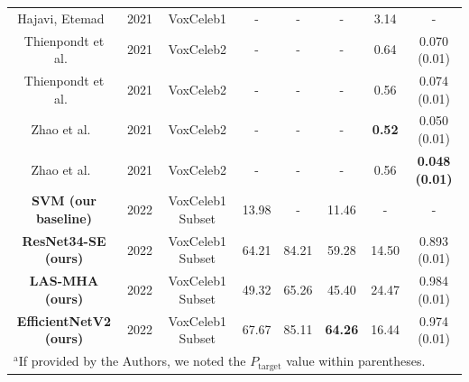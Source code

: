 \documentclass[conference]{IEEEtran}
\begin{document}
\begin{table}[htbp]
\begin{center}
\begin{tabular}{|c|c|c|c|c|c|c|c|}
        Hajavi, Etemad~\cite{hajavi2021siamese} & 2021 & VoxCeleb1 & - & - & - & 3.14 & - \\
        Thienpondt et al.~\cite{thienpondt2021voxsrc} & 2021 & VoxCeleb2 & - & - & - & 0.64 & 0.070 (0.01) \\
        Thienpondt et al.~\cite{thienpondt2021voxsrc} & 2021 & VoxCeleb2 & - & - & - & 0.56 & 0.074 (0.01) \\
        Zhao et al.~\cite{zhao2021speakin} & 2021 & VoxCeleb2 & - & - & - & \textbf{0.52} & 0.050 (0.01) \\
        Zhao et al.~\cite{zhao2021speakin} & 2021 & VoxCeleb2 & - & - & - & 0.56 & \textbf{0.048 (0.01)} \\
        \hline
        \textbf{SVM (our baseline)} & 2022 & VoxCeleb1 Subset & 13.98 & - & 11.46 & - & - \\
        \textbf{ResNet34-SE (ours)} & 2022 & VoxCeleb1 Subset & 64.21 & 84.21 & 59.28 & 14.50 & 0.893 (0.01) \\
        \textbf{LAS-MHA (ours)} & 2022 & VoxCeleb1 Subset & 49.32 & 65.26 & 45.40 & 24.47 & 0.984 (0.01) \\
        \textbf{EfficientNetV2 (ours)} & 2022 & VoxCeleb1 Subset & 67.67 & 85.11 & \textbf{64.26} & 16.44 & 0.974 (0.01) \\
        \hline
        \multicolumn{8}{l}{$^{\mathrm{a}}$If provided by the Authors, we noted the $P_{\text{target}}$ value within parentheses.} \\
        \end{tabular}
        \label{tab:results}
    \end{center}
\end{table}
\end{document}
